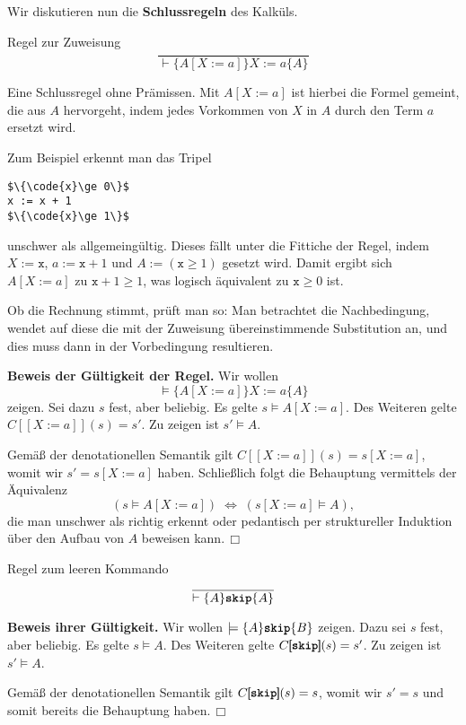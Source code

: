 \documentclass[8pt,fleqn,aspectratio=169]{beamer}
\newcommand{\strong}[1]{\textsf{\textbf{#1}}}
\renewcommand{\qedsymbol}{\ensuremath{\Box}}
\newcommand{\parspace}{\vspace{0.8em}}
\newcommand{\kw}[1]{\textbf{\texttt{#1}}}
\newcommand{\code}[1]{{\texttt{#1}}}
\newcommand{\qb}[1]{[\!\![#1]\!\!]}
\begin{document}
\begin{frame}[fragile]
Wir diskutieren nun die \strong{Schlussregeln} des Kalküls.\pause

\parspace
\begin{block}{Regel zur Zuweisung}
\[\dfrac{}{\vdash\{A[X:=a]\}X:=a\{A\}}\]
\end{block}
Eine Schlussregel ohne Prämissen. Mit $A[X:=a]$ ist hierbei die
Formel gemeint, die aus $A$ hervorgeht, indem jedes Vorkommen von
$X$ in $A$ durch den Term $a$ ersetzt wird.\pause

\parspace
Zum Beispiel erkennt man das Tripel
\begin{lstlisting}[language=IMP, xleftmargin=\mathindent, mathescape]
$\{\code{x}\ge 0\}$
x := x + 1
$\{\code{x}\ge 1\}$
\end{lstlisting}
unschwer als allgemeingültig. Dieses fällt unter die Fittiche der
Regel, indem $X:=\code{x}$, $a:=\code{x}+1$ und $A:=(\code{x}\ge 1)$
gesetzt wird. Damit ergibt sich $A[X:=a]$ zu $\code{x} + 1\ge 1$,
was logisch äquivalent zu $\code{x}\ge 0$ ist.
\end{frame}

\begin{frame}
Ob die Rechnung stimmt, prüft man so: Man betrachtet die Nachbedingung,
wendet auf diese die mit der Zuweisung übereinstimmende Substitution an,
und dies muss dann in der Vorbedingung resultieren.\pause

\parspace
\strong{Beweis der Gültigkeit der Regel.} Wir wollen
\[\models\{A[X:=a]\}X:=a\{A\}\]
zeigen.\pause{} Sei dazu $s$ fest, aber beliebig. Es gelte $s\models A[X:=a]$.
Des Weiteren gelte $C\qb{X:=a}(s)=s'$. Zu zeigen ist $s'\models A$.\pause

\parspace
Gemäß der denotationellen Semantik gilt $C\qb{X:=a}(s)=s[X:=a]$, womit
wir $s'=s[X:=a]$ haben. Schließlich folgt die Behauptung vermittels
der Äquivalenz
\[(s\models A[X:=a])\;\Leftrightarrow\; (s[X:=a]\models A),\]
die man unschwer als richtig erkennt oder pedantisch per struktureller
Induktion über den Aufbau von $A$ beweisen kann.\,\qedsymbol
\end{frame}

\begin{frame}
\begin{block}{Regel zum leeren Kommando}
\[\dfrac{}{\vdash\{A\}\kw{skip}\{A\}}\]
\end{block}\pause
\strong{Beweis ihrer Gültigkeit.}
Wir wollen $\models\{A\}\kw{skip}\{B\}$ zeigen.
Dazu sei $s$ fest, aber beliebig. Es gelte $s\models A$. Des Weiteren
gelte $C\qb{\kw{skip}}(s)=s'$. Zu zeigen ist $s'\models A$.\pause

\parspace
Gemäß der denotationellen Semantik gilt $C\qb{\kw{skip}}(s)=s$, womit
wir $s'=s$ und somit bereits die Behauptung haben.\,\qedsymbol
\end{frame}
\end{document}

